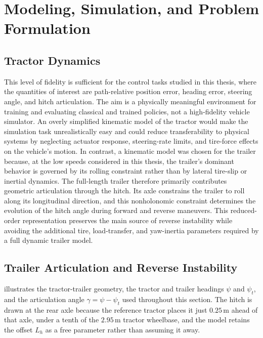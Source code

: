 \chapter{Modeling, Simulation, and Problem Formulation}
\label{ch:modeling_simulation_problem}
\label{ch:modeling}

\section{Tractor Dynamics}
\label{sec:tractor_dynamics}



This level of fidelity is sufficient for the control tasks studied in this thesis, where the quantities of interest are path-relative position error, heading error, steering angle, and hitch articulation. The aim is a physically meaningful environment for training and evaluating classical and trained policies, not a high-fidelity vehicle simulator. An overly simplified kinematic model of the tractor would make the simulation task unrealistically easy and could reduce transferability to physical systems by neglecting actuator response, steering-rate limits, and tire-force effects on the vehicle's motion. In contrast, a kinematic model was chosen for the trailer because, at the low speeds considered in this thesis, the trailer's dominant behavior is governed by its rolling constraint rather than by lateral tire-slip or inertial dynamics. The full-length trailer therefore primarily contributes geometric articulation through the hitch. Its axle constrains the trailer to roll along its longitudinal direction, and this nonholonomic constraint determines the evolution of the hitch angle during forward and reverse maneuvers. This reduced-order representation preserves the main source of reverse instability while avoiding the additional tire, load-transfer, and yaw-inertia parameters required by a full dynamic trailer model.

\section{Trailer Articulation and Reverse Instability}

 illustrates the tractor-trailer geometry, the tractor and trailer headings $\psi$ and $\psi_t$, and the articulation angle $\gamma = \psi - \psi_t$ used throughout this section. The hitch is drawn at the rear axle because the reference tractor places it just $0.25$\,m ahead of that axle, under a tenth of the $2.95$\,m tractor wheelbase, and the model retains the offset $L_h$ as a free parameter rather than assuming it away.

